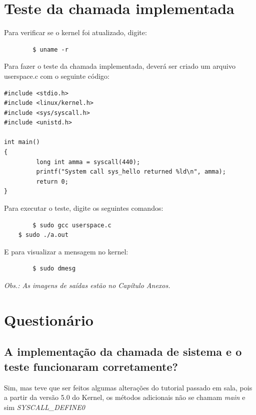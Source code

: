 \documentclass[12pt, a4paper]{article}
\begin{document}
	\section{Teste da chamada implementada}
	
	\par Para verificar se o kernel foi atualizado, digite:
	
	\begin{verbatim}
	    $ uname -r
	\end{verbatim}
	
	\par Para fazer o teste da chamada implementada, deverá ser criado um arquivo userspace.c com o seguinte código:
	
    \begin{lstlisting}
#include <stdio.h>
#include <linux/kernel.h>
#include <sys/syscall.h>
#include <unistd.h>

int main()
{
         long int amma = syscall(440);
         printf("System call sys_hello returned %ld\n", amma);
         return 0;
}
    \end{lstlisting}
    
    \par Para executar o teste, digite os seguintes comandos:
    
    \begin{verbatim}
	    $ sudo gcc userspace.c
    $ sudo ./a.out
	\end{verbatim}
	
	\par E para visualizar a mensagem no kernel:
	\begin{verbatim}
	    $ sudo dmesg
	\end{verbatim}
	
	\par \textit{Obs.: As imagens de saídas estão no Capítulo Anexos.}\\

	\section{Questionário}

	\subsection{A implementação da chamada de sistema e o teste funcionaram corretamente?}

	\par Sim, mas teve que ser feitos algumas alterações do tutorial passado em sala, pois a partir da versão 5.0 do Kernel, os métodos adicionais não se chamam \textit{main} e sim \textit{SYSCALL\_DEFINE0}
\end{document}
